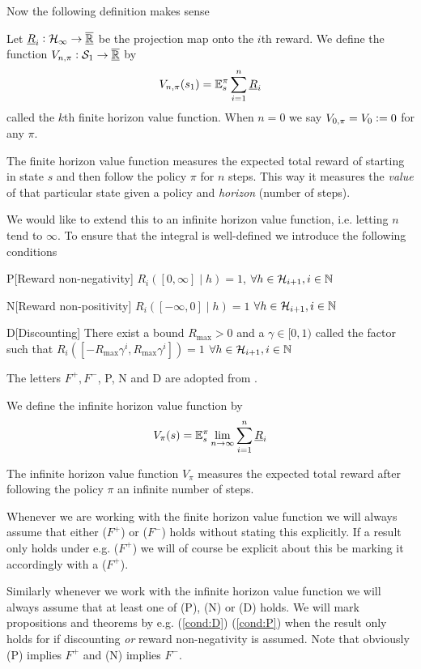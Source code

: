 Now the following definition makes sense 
\begin{defn}
  Let $\underline{R}_i : \mathcal{H}_\infty \to \overline{\underline{\mathbb{R}}}$ be the projection map onto the
  $i$th reward. We define the function $V_{n, \pi} : \mathcal{S}_1 \to \overline{\underline{\mathbb{R}}}$ by
  \[ V_{n,\pi}(s_1) = \mathbb{E}_s^\pi \sum_{i=1}^n \underline{R}_i \]
  called the $k$th finite horizon value function.
  When $n=0$ we say $V_{0,\pi} = V_0 \vcentcolon= 0$ for any $\pi$.
\end{defn}
The finite horizon value function
measures the expected total reward of starting in state $s$
and then follow the policy $\pi$ for $n$ steps.
This way it measures the \emph{value} of that particular state
given a policy and \emph{horizon} (number of steps).

We would like to extend this to an infinite horizon value function,
i.e. letting $n$ tend to $\infty$. To ensure that the integral is well-defined
we introduce the following conditions
\begin{cond}{P}[Reward non-negativity] $R_i([0,\infty] \mid h) = 1$,
  $\forall h \in \mathcal{H}_{i+1}, i \in \mathbb{N}$
  \label{cond:P}
\end{cond}
\begin{cond}{N}[Reward non-positivity] $R_i([-\infty, 0] \mid h) = 1$
  $\forall h \in \mathcal{H}_{i+1}, i \in \mathbb{N}$
  \label{cond:N} 
\end{cond}
\begin{cond}{D}[Discounting] There exist a bound $R_{\max} > 0$ and a
  $\gamma \in [0,1)$ called the  factor such that
  $R_i([-R_{\max} \gamma^i, R_{\max} \gamma^i]) = 1$
  $\forall h \in \mathcal{H}_{i+1}, i \in \mathbb{N}$
  \label{cond:D}
\end{cond}
\begin{rem}
  The letters $F^+, F^-$, P, N and D are adopted from . 
\end{rem}
\begin{defn}
  We define the infinite horizon value function by
  \[ V_\pi(s) = \mathbb{E}_s^\pi \lim_{n \to \infty} \sum_{i=1}^n \underline{R}_i \]
\end{defn}
The infinite horizon value function $V_\pi$ measures the expected total
reward after following the policy $\pi$ an infinite number of steps.

\begin{rem}
  Whenever we are working with the finite horizon value function
  we will always assume that either ($F^+$) or ($F^-$) holds without
  stating this explicitly.
  If a result only holds under e.g. ($F^+$) we will of course be explicit
  about this be marking it accordingly with a ($F^+$).

  Similarly whenever we work with the infinite horizon value function we will
  always assume that at least one of (P), (N) or (D) holds.
  We will mark propositions and theorems
  by e.g. (\cref{cond:D}) (\cref{cond:P}) when
  the result only holds for if discounting \emph{or} reward non-negativity
  is assumed.
  Note that obviously (P) implies $F^+$ and (N) implies $F^-$.
\end{rem}

